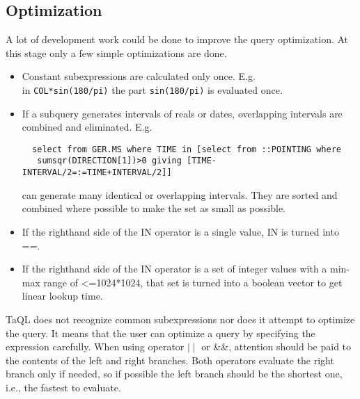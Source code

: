 \subsection{Optimization}
A lot of development work could be done to improve the query optimization.
At this stage only a few simple optimizations are done.
\begin{itemize}
\item Constant subexpressions are calculated only once. E.g.
\\in \texttt{COL*sin(180/pi)} the part \texttt{sin(180/pi)} is
evaluated once.
\item If a subquery generates intervals of reals or dates, overlapping
intervals are combined and eliminated. E.g.
\begin{verbatim}
  select from GER.MS where TIME in [select from ::POINTING where
   sumsqr(DIRECTION[1])>0 giving [TIME-INTERVAL/2=:=TIME+INTERVAL/2]]
\end{verbatim}
can generate many identical or overlapping intervals. They are
sorted and combined where possible to make the set as small as
possible.
\item If the righthand side of the IN operator is a single value, IN
  is turned into ==.
\item If the righthand side of the IN operator is a set of integer
  values with a min-max range of <=1024*1024, that set is turned into
  a boolean vector to get linear lookup time.
\end{itemize}

TaQL does not recognize common subexpressions nor does it attempt to
optimize the query.
It means that the user can optimize a query by specifying the expression
carefully. When using operator $\mid\mid$ or \&\&,
attention should be
paid to the contents of the left and right branches. Both operators
evaluate the right branch only if needed, so if possible the left branch
should be the shortest one, i.e., the fastest to evaluate.

